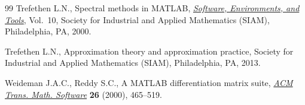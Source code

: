 \documentclass[pdftex]{sigma}
\begin{document}
\begin{thebibliography}{99}
Trefethen L.N., Spectral methods in {MATLAB}, \href{https://doi.org/10.1137/1.9780898719598}{\textit{Software, Environments,
 and Tools}}, Vol.~10, Society for Industrial and Applied Mathematics (SIAM), Philadelphia, PA, 2000.

Trefethen L.N., Approximation theory and approximation practice, Society for
 Industrial and Applied Ma\-the\-matics (SIAM), Philadelphia, PA, 2013.

Weideman J.A.C., Reddy S.C., A {MATLAB} differentiation matrix suite,
 \href{https://doi.org/10.1145/365723.365727}{\textit{ACM Trans. Math. Software}} \textbf{26} (2000), 465--519.

\end{thebibliography}\LastPageEnding
\end{document}
